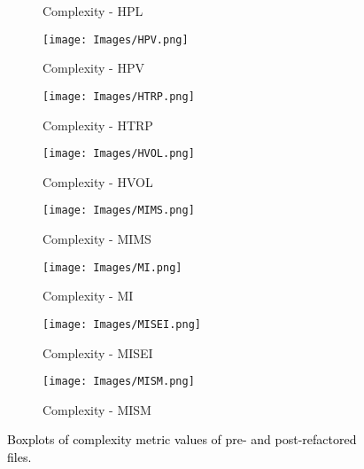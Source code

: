 \begin{figure*}
\begin{subfigure}{3.5cm}
\caption{Complexity - HPL}
\label{BP:Complexity-hpl}
\end{subfigure}%
\begin{subfigure}{3.5cm}
\centering\texttt{[image: Images/HPV.png]}
\caption{Complexity - HPV}
\label{BP:Complexity-hpv}
\end{subfigure}%
\begin{subfigure}{3.5cm}
\centering\texttt{[image: Images/HTRP.png]}
\caption{Complexity - HTRP}
\label{BP:Complexity-htrp}
\end{subfigure}%
\begin{subfigure}{3.5cm}
\centering\texttt{[image: Images/HVOL.png]}
\caption{Complexity - HVOL}
\label{BP:Complexity-hvol}
\end{subfigure}%
\vspace{9pt}
\begin{subfigure}{3.5cm}
\centering\texttt{[image: Images/MIMS.png]}
\caption{Complexity - MIMS}
\label{BP:Complexity-mims}
\end{subfigure}%
\begin{subfigure}{3.5cm}
\centering\texttt{[image: Images/MI.png]}
\caption{Complexity - MI}
\label{BP:Complexity-mi}
\end{subfigure}%
\begin{subfigure}{3.5cm}
\centering\texttt{[image: Images/MISEI.png]}
\caption{Complexity - MISEI}
\label{BP:Complexity-misei}
\end{subfigure}%
\begin{subfigure}{3.5cm}
\centering\texttt{[image: Images/MISM.png]}
\caption{Complexity - MISM}
\label{BP:Complexity-mism}
\end{subfigure}%
\caption{\textcolor{black}{Boxplots of complexity metric values of pre- and post-refactored files.}}
\label{Chart:Boxplots_complexity}
\end{figure*}








